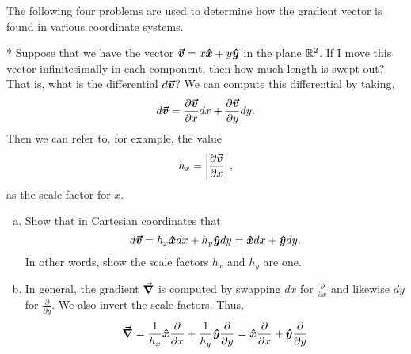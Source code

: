 \documentclass[12pt]{article} %
\begin{document}
\vspace*{1cm}
\begin{center} The following four problems are used to determine how the gradient vector is found in various coordinate systems.
\end{center}

\vspace*{1cm}
\begin{problem} *
    Suppose that we have the vector $\boldsymbol{\boldsymbol{\vec{v}}} = x\boldsymbol{\hat{x}} + y\boldsymbol{\hat{y}}$ in the plane $\mathbb{R}^2$.  If I move this vector infinitesimally in each component, then how much length is swept out? That is, what is the differential $d\boldsymbol{\boldsymbol{\vec{v}}}$? We can compute this differential by taking,
    \[
    d\boldsymbol{\boldsymbol{\vec{v}}} = \frac{\partial \boldsymbol{\boldsymbol{\vec{v}}}}{\partial x}dx+\frac{\partial \boldsymbol{\boldsymbol{\vec{v}}}}{\partial y}dy.
    \]
    Then we can refer to, for example, the value
    \[
    h_x = \left| \frac{\partial \boldsymbol{\boldsymbol{\vec{v}}}}{\partial x} \right|,
    \]
    as the scale factor for $x$.
    \begin{enumerate}[(a)]
        \item Show that in Cartesian coordinates that
        \[
        d\boldsymbol{\boldsymbol{\vec{v}}} = h_x \boldsymbol{\hat{x}} dx + h_y \boldsymbol{\hat{y}} dy = \boldsymbol{\hat{x}} dx + \boldsymbol{\hat{y}} dy.
        \]
        In other words, show the scale factors $h_x$ and $h_y$ are one.
        \item In general, the gradient $\boldsymbol{\vec{\nabla}}$ is computed by swapping $dx$ for $\frac{\partial}{\partial x}$ and likewise $dy$ for $\frac{\partial}{\partial y}$.  We also invert the scale factors. Thus,
        \[
        \boldsymbol{\vec{\nabla}} = \frac{1}{h_x} \boldsymbol{\hat{x}} \frac{\partial }{\partial x} + \frac{1}{h_y} \boldsymbol{\hat{y}} \frac{\partial }{\partial y} = \boldsymbol{\hat{x}} \frac{\partial }{\partial x} + \boldsymbol{\hat{y}} \frac{\partial }{\partial y}
        \]
    \end{enumerate}
\end{problem}
\end{document}
